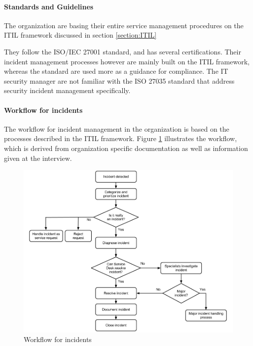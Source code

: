 \paragraph{Standards and Guidelines}
The organization are basing their entire service management procedures on the ITIL framework discussed in section \ref{section:ITIL} 

They follow the ISO/IEC 27001 standard, and has several certifications. Their incident management processes however are mainly built on the ITIL framework, whereas the standard are used more as a guidance for compliance. The IT security manager are not familiar with the ISO 27035 standard that address security incident management specifically. 

\paragraph{Workflow for incidents}
The workflow for incident management in the organization is based on the processes described in the ITIL framework. Figure \ref{fig:workflowcaseC} illustrates the workflow, which is derived from organization specific documentation as well as information given at the interview. 

\begin{figure}[H]
\hspace{-1.1cm}\includegraphics[scale=0.49]{workflowcaseC.png}
\caption[Workflow for incidents, Case B]{Workflow for incidents}
\label{fig:workflowcaseC}
\end{figure}

